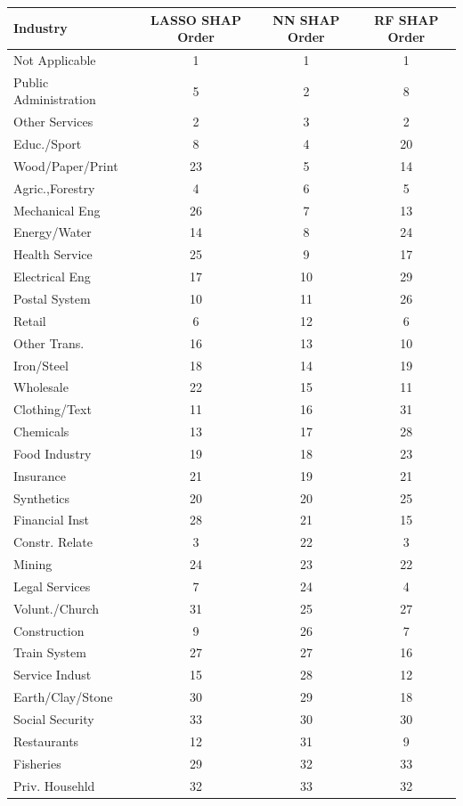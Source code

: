 \begin{tabular}{lccc}
\hline\hline
Industry & LASSO SHAP Order & NN SHAP Order & RF SHAP Order \\
\hline
Not Applicable&1&1&1\\
Public Administration&5&2&8\\
Other Services&2&3&2\\
Educ./Sport&8&4&20\\
Wood/Paper/Print&23&5&14\\
Agric.,Forestry&4&6&5\\
Mechanical Eng&26&7&13\\
Energy/Water&14&8&24\\
Health Service&25&9&17\\
Electrical Eng&17&10&29\\
Postal System&10&11&26\\
Retail&6&12&6\\
Other Trans.&16&13&10\\
Iron/Steel&18&14&19\\
Wholesale&22&15&11\\
Clothing/Text&11&16&31\\
Chemicals&13&17&28\\
Food Industry&19&18&23\\
Insurance&21&19&21\\
Synthetics&20&20&25\\
Financial Inst&28&21&15\\
Constr. Relate&3&22&3\\
Mining&24&23&22\\
Legal Services&7&24&4\\
Volunt./Church&31&25&27\\
Construction&9&26&7\\
Train System&27&27&16\\
Service Indust&15&28&12\\
Earth/Clay/Stone&30&29&18\\
Social Security&33&30&30\\
Restaurants&12&31&9\\
Fisheries&29&32&33\\
Priv. Househld&32&33&32\\
\hline\hline
\end{tabular}
